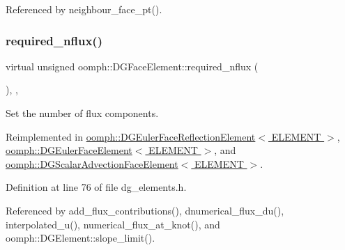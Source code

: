 Referenced by neighbour\+\_\+face\+\_\+pt().

\mbox{\label{classoomph_1_1DGFaceElement_af45b5a88226a143c8fafbc5f3e097526}} 
\subsubsection{\texorpdfstring{required\+\_\+nflux()}{required\_nflux()}}
{\footnotesize\ttfamily virtual unsigned oomph\+::\+D\+G\+Face\+Element\+::required\+\_\+nflux (\begin{DoxyParamCaption}{ }\end{DoxyParamCaption})\hspace{0.3cm}{\ttfamily [inline]}, {\ttfamily [protected]}, {\ttfamily [virtual]}}



Set the number of flux components. 



Reimplemented in \hyperlink{classoomph_1_1DGEulerFaceReflectionElement_a51f6048bc1f1c033933c65430dd0c323}{oomph\+::\+D\+G\+Euler\+Face\+Reflection\+Element$<$ E\+L\+E\+M\+E\+N\+T $>$}, \hyperlink{classoomph_1_1DGEulerFaceElement_aa20647527c6e5dc1febb13e575d971bb}{oomph\+::\+D\+G\+Euler\+Face\+Element$<$ E\+L\+E\+M\+E\+N\+T $>$}, and \hyperlink{classoomph_1_1DGScalarAdvectionFaceElement_ae3c10d2af6a6aae42ced528040a4d530}{oomph\+::\+D\+G\+Scalar\+Advection\+Face\+Element$<$ E\+L\+E\+M\+E\+N\+T $>$}.



Definition at line 76 of file dg\+\_\+elements.\+h.



Referenced by add\+\_\+flux\+\_\+contributions(), dnumerical\+\_\+flux\+\_\+du(), interpolated\+\_\+u(), numerical\+\_\+flux\+\_\+at\+\_\+knot(), and oomph\+::\+D\+G\+Element\+::slope\+\_\+limit().

\mbox{\label{classoomph_1_1DGFaceElement_a23d30d2a32fb5c04531de2339e21ea06}} 
